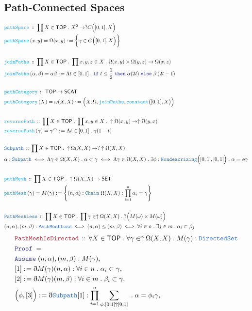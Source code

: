 \documentclass[12pt]{scrartcl}
\newcommand{\TYPE}[1]{\textcolor{NavyBlue}{\mathtt{#1}}}
\newcommand{\FUNC}[1]{\textcolor{Cerulean}{\mathtt{#1}}}
\newcommand{\LOGIC}[1]{\textcolor{Blue}{\mathtt{#1}}}
\newcommand{\THM}[1]{\textcolor{Maroon}{\mathtt{#1}}}
\renewcommand{\.}{\; . \;}
\newcommand{\de}{: \kern 0.1pc =}
\newcommand{\If}{\LOGIC{if} \;}
\newcommand{\Then}{ \; \LOGIC{then} \;}
\newcommand{\Else}{\; \LOGIC{else} \;}
\newcommand{\Act}[1]{\left( #1 \right)}
\newcommand{\Theorem}[2]{& \THM{#1} \, :: \, #2 \\ & \Proof = \\ }
\newcommand{\DeclareType}[2]{& \TYPE{#1} \, :: \, #2 \\}
\newcommand{\DefineNamedType}[4]{& #1 : \TYPE{#2} \iff #3 \iff #4 \\}
\newcommand{\DeclareFunc}[2]{& \FUNC{#1} \, :: \, #2 \\}
\newcommand{\DefineNamedFunc}[4]{&  \FUNC{#1}\Act{#2} = #3 \de #4 \\}
\newcommand{\Page}[1]{ \begin{align*} #1 \end{align*}   }
\newcommand{ \bd }{ \ByDef }
\newcommand{\Say}[3]{& #1 \de #2 : #3, \\}
\newcommand{\Assume}[2]{& \LOGIC{Assume} \; #1 : #2, \\}
\newcommand{\ByDef}{\eth}
\newcommand{\Proof}{\LOGIC{Proof} \; }
\newcommand{\SET}{\mathsf{SET}}
\newcommand{\TOP}{\mathsf{TOP}}
\begin{document}
\subsection{Path-Connected Spaces}
\Page{
	\DeclareFunc{pathSpace}{\prod X \in \TOP \.  X^2 \to ?C\Big([0,1],X\Big)}
	\DefineNamedFunc{pathSpace}{x,y}
	{\Omega(x,y)}{\bigg\{ \gamma \in C\Big([0,1], X \Big)  \bigg\}}
	\\
	\DeclareFunc{joinPaths}
	{\prod  X \in \TOP \. \prod x,y,z \in X \. \Omega(x,y)\times \Omega(y,z) \to \Omega(x,z)}
	\DefineNamedFunc{joinPaths}{\alpha, \beta}{\alpha \beta}
	{\Lambda t \in [0,1] \. \If t \le \frac{1}{2} \Then \alpha(2t) 
		\Else  \beta\left(  2t -  1 \right)}
	\\
	\DeclareFunc{pathCategory}{\TOP \to \mathsf{SCAT}}
	\DefineNamedFunc{pathCategory}{X}{ \omega(X,X) }
	{ \Big(  X, \Omega, \FUNC{joinPaths}, \FUNC{constant}\big([0,1], X\big)   \Big)}            
	\\
	\DeclareFunc{reversePath}
	{\prod X \in \TOP \. \prod x,y \in X \. \uparrow\Omega(x,y) \to \uparrow\Omega(y,x) }
	\DefineNamedFunc{reversePath}{\gamma}
	{\gamma^\curvearrowleft}{\Lambda t \in [0,1] \. \gamma(1 - t)}
	\\
	\DeclareType{Subpath}{\prod X \in \TOP \. \uparrow \Omega(X,X) \to ?\uparrow\Omega(X,X)}
	\DefineNamedType{\alpha}{Subpath}
	{\Lambda \gamma \in \Omega(X,X) \. \alpha \subset \gamma }
	{
		\Lambda \gamma \in \Omega(X,X) \. 
		\exists \phi : \TYPE{Nondeacrizing}\Big([0,1],[0,1]\Big) \.
		\alpha = \phi\gamma
	}
	\\
	\DeclareFunc{pathMesh}{ \prod X \in \TOP \.\uparrow \Omega(X,X) \to \SET}
	\DefineNamedFunc{pathMesh}{\gamma}
	{M(\gamma)  }{  \left\{ (n,\alpha) : \TYPE{Chain}\; \Omega(X,X)  : 
		\prod^n_{i=1} \alpha_i = \gamma  \right\}}	
	\\
	\DeclareType{PathMeshLess}{\prod X \in \TOP \. \prod \gamma \in \uparrow \Omega(X,X) \.
		?\Big( M(\omega) \times M(\omega) \Big)}
	\DefineNamedType{(n,\alpha),(m,\beta)}{PathMeshLess}
	{ (n,\alpha) \le (m,\beta)}{\forall i \in n \. \exists j \in m : \alpha_i \subset \beta_j }
}\Page{
	\Theorem{PathMeshIsDirected}{\forall X \in \TOP \. \forall \gamma \in \uparrow \Omega(X,X)
	\. M(\gamma) : \TYPE{DirectedSet}}
	\Assume{(n,\alpha),(m,\beta)}{M(\gamma)}
	\Say{[1]}{\bd M(\gamma)(n,\alpha)}{ \forall i \in n \. \alpha_i \subset \gamma}
	\Say{[2]}{\bd M(\gamma)(m,\beta)}{ \forall i \in m \. \beta_i \subset \gamma}
	\Say{\Big(\phi,[3]\Big)}{\bd \TYPE{Subpath}[1]}
	{ \prod^n_{i=1} \sum_{\phi : [0,1]\uparrow [0,1]} \. \alpha = \phi_i \gamma }  
}
\end{document}
